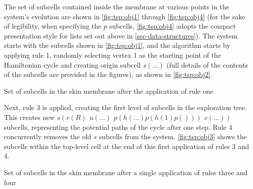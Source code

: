 The set of subcells contained inside the membrane at various points in the system's evolution are shown in \cref{fig:tsp:obj1} through \cref{fig:tsp:obj4} (for the sake of legibility, when specifying the \(p\) subcells, \cref{fig:tsp:obj4} adopts the compact presentation style for lists set out above in \cref{sec-data-structures}).  The system starts with the subcells shown in \cref{fig:tsp:obj1}, and the algorithm starts by applying rule 1, randomly selecting vertex 1 as the starting point of the Hamiltonian cycle and creating origin subcell \(s(...)\) (full details of the contents of the subcells are provided in the figures), as shown in \cref{fig:tsp:obj2}.

\begin{cpobjectsfloat}
\begin{cpobjects}
\end{cpobjects}
\caption{\label{fig:tsp:obj2}Set of subcells in the skin membrane after the application of rule one}
\end{cpobjectsfloat}

Next, rule 3 is applied, creating the first level of subcells in the exploration tree.  This creates new \(s(r(R) ~ \,u(...) ~ \,p(h(...)p(h(1)p())) ~ \,c(...))\) subcells, representing the potential paths of the cycle after one step.  Rule 4 concurrently removes the old \(s\) subcells from the system.  \cref{fig:tsp:obj3} shows the subcells within the top-level cell at the end of this first application of rules 3 and 4.

\begin{cpobjectsfloat}
\begin{cpobjects}
\end{cpobjects}
\caption{\label{fig:tsp:obj3}Set of subcells in the skin membrane after a single application of rules three and four}
\end{cpobjectsfloat}

